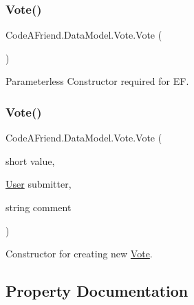 \subsubsection{\texorpdfstring{Vote()}{Vote()}\hspace{0.1cm}{\footnotesize\ttfamily [1/2]}}
{\footnotesize\ttfamily Code\+A\+Friend.\+Data\+Model.\+Vote.\+Vote (\begin{DoxyParamCaption}{ }\end{DoxyParamCaption})\hspace{0.3cm}{\ttfamily [protected]}}



Parameterless Constructor required for EF.

\mbox{\label{class_code_a_friend_1_1_data_model_1_1_vote_ac4cd3a11d8dfa4ea9051393dc9a5fa72}} 
\subsubsection{\texorpdfstring{Vote()}{Vote()}\hspace{0.1cm}{\footnotesize\ttfamily [2/2]}}
{\footnotesize\ttfamily Code\+A\+Friend.\+Data\+Model.\+Vote.\+Vote (\begin{DoxyParamCaption}\item[{short}]{value,  }\item[{\mbox{\hyperlink{class_code_a_friend_1_1_data_model_1_1_user}{User}}}]{submitter,  }\item[{string}]{comment }\end{DoxyParamCaption})}



Constructor for creating new \mbox{\hyperlink{class_code_a_friend_1_1_data_model_1_1_vote}{Vote}}.



\subsection{Property Documentation}
\mbox{\label{class_code_a_friend_1_1_data_model_1_1_vote_a470006d756d9b6f8b61a2cc97c6c9628}} 
